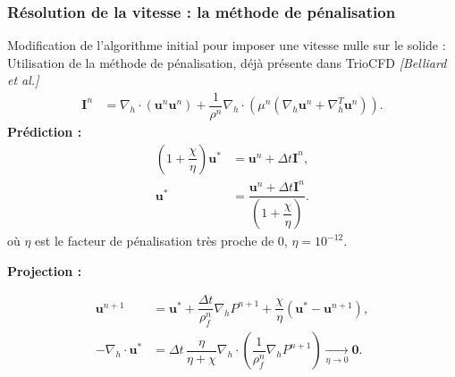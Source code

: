 \documentclass{beamer}
\newcommand{\vect}[1]{\bm{#1}}
\newcommand{\npl}{{n+1}}
\newcommand{\bib}[1]{{\color{cea_texte!80}\tiny\textit{[#1]}}}
\renewcommand{\frac}{\dfrac}
\begin{document}
\begin{frame}
    \frametitle{Résolution de la vitesse : la méthode de pénalisation}
    \footnotesize
     \footnotesize
        \begin{ceablock}{Modification de l'algorithme initial pour imposer une vitesse nulle sur le solide :}
	Utilisation de la méthode de pénalisation, déjà présente dans TrioCFD \bib{Belliard et al.}
\begin{align}
	\vect{I}^n &= \nabla_h \cdot (\vect{u}^n \vect{u}^n) + \frac{1}{\rho^n} \nabla_h \cdot(\mu^n(\nabla_h \vect{u}^n+\nabla_h^T \vect{u}^n)).
\end{align}
	\textbf{Prédiction :}
\begin{align}
	(1+\frac{\chi}{\eta} ) \vect{u}^* &= \vect{u}^n + \Delta t \vect{I}^n, \label{eq:PDFpred1} \\ 
	\vect{u}^* &= \frac{\vect{u}^n + \Delta t \vect{I}^n}{(1+\frac{\chi}{\eta} )}. \label{eq:PDFpred2}
\end{align}
	où $\eta$ est le facteur de pénalisation très proche de $0$, $\eta=10^{-12}$.
	

	\textbf{Projection :}

\begin{align}
	\vect{u}^{n+1} &= \vect{u}^* + \frac{\Delta t}{\rho^n_f} \nabla_h P^{n+1} +\frac{\chi}{\eta}(\vect{u}^*-\vect{u}^\npl),\\
-\nabla_h \cdot \vect{u}^* &= \Delta t \, \frac{\eta}{\eta + \chi} \nabla_h \cdot \left( \frac{1}{\rho^n_f} \nabla_h P^\npl \right) \underset{\eta \to 0}{\longrightarrow} \vect{0}.
%
\end{align}
	\end{ceablock}

\end{frame}
\end{document}

